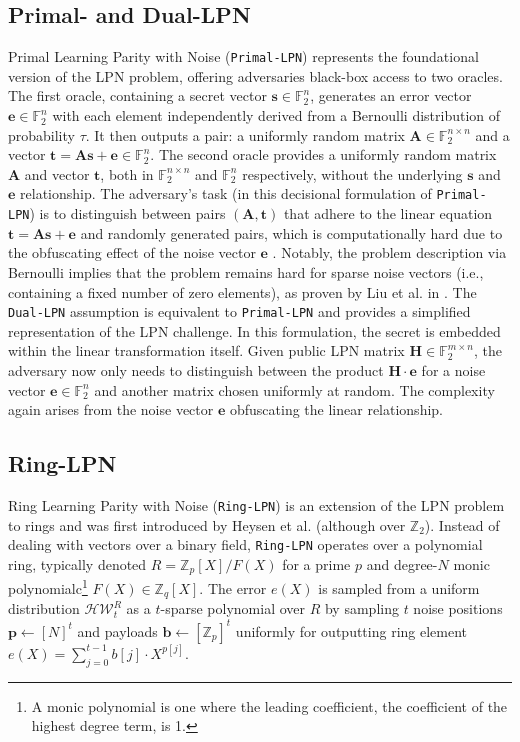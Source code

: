 \subsection{Primal- and Dual-LPN}
Primal Learning Parity with Noise (\texttt{Primal-LPN}) represents the foundational version of the LPN problem, offering adversaries black-box access to two oracles. The first oracle, containing a secret vector \( \mathbf{s} \in \mathbb{F}_2^{n} \), generates an error vector \( \mathbf{e} \in \mathbb{F}_2^{n} \) with each element independently derived from a Bernoulli distribution of probability \( \tau \). It then outputs a pair: a uniformly random matrix \( \mathbf{A} \in \mathbb{F}_2^{n\times n} \) and a vector \( \mathbf{t} = \mathbf{A}\mathbf{s} + \mathbf{e} \in \mathbb{F}_2^{n} \). The second oracle provides a uniformly random matrix \( \mathbf{A} \) and vector \( \mathbf{t} \), both in \( \mathbb{F}_2^{n\times n} \) and \( \mathbb{F}_2^{n} \) respectively, without the underlying \( \mathbf{s} \) and \( \mathbf{e} \) relationship. The adversary's task (in this decisional formulation of \texttt{Primal-LPN}) is to distinguish between pairs \((\mathbf{A}, \mathbf{t})\) that adhere to the linear equation \(\mathbf{t} = \mathbf{A}\mathbf{s} + \mathbf{e}\) and randomly generated pairs, which is computationally hard due to the obfuscating effect of the noise vector \( \mathbf{e} \) \cite{zhao2018hardness}. Notably, the problem description via Bernoulli implies that the problem remains hard for sparse noise vectors (i.e., containing a fixed number of zero elements), as proven by Liu et al. in \cite{liu2017hardness}. The \texttt{Dual-LPN} assumption is equivalent to \texttt{Primal-LPN} \cite{couteau2021silver} and provides a simplified representation of the LPN challenge. In this formulation, the secret is embedded within the linear transformation itself. Given public LPN matrix $\mathbf{H} \in \mathbb{F}_2^{m \times n}$, the adversary now only needs to distinguish between the product $\mathbf{H} \cdot \mathbf{e}$ for a noise vector $\mathbf{e}\in \mathbb{F}_2^{n}$ and another matrix chosen uniformly at random. The complexity again arises from the noise vector \(\mathbf{e}\) obfuscating the linear relationship.

\subsection{Ring-LPN}
\label{prelim:ring_lpn}
Ring Learning Parity with Noise (\texttt{Ring-LPN}) is an extension of the LPN problem to rings and was first introduced by Heysen et al. (although over $\mathbb{Z}_2$). Instead of dealing with vectors over a binary field, \texttt{Ring-LPN} operates over a polynomial ring, typically denoted $R =\mathbb{Z}_p[X]/F(X)$ for a prime $p$ and degree-$N$ monic polynomialc\footnote{A monic polynomial is one where the leading coefficient, the coefficient of the highest degree term, is 1.} $F(X)\in \mathbb{Z}_q[X] $. The error $e(X)$ is sampled from a uniform distribution $\mathcal{H W}_{t}^{R}$ as a $t$-sparse polynomial over $R$ by sampling $t$ noise positions $\mathbf{p} \leftarrow [N]^t$ and payloads $\mathbf{b} \leftarrow [\mathbb{Z}_p]^t$ uniformly for outputting ring element $e(X) = \sum_{j=0}^{t-1} b[j] \cdot X^{p[j]}$. 

